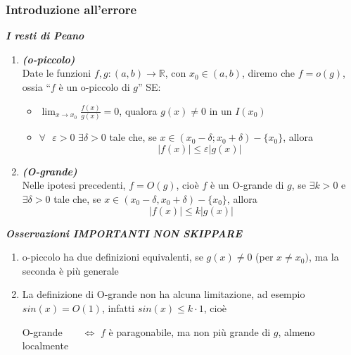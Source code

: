 \documentclass{article}
\theoremstyle{definition}
\newcommand{\R}{\mathbb{R}}
\newcommand{\virgolette}[1]{``#1''}
\begin{document}
\subsubsection{Introduzione all'errore}
    \begin{center}
        \textbf{\textit{I resti di Peano}}
    \end{center}
    \begin{enumerate}
        \item \textbf{\textit{(o-piccolo)}}
        \\
        Date le funzioni $f,g: (a,b) \to \R$, con $x_0 \in (a,b)$, diremo che $f=o(g)$, ossia \virgolette{$f$ è un o-piccolo di $g$} SE:
        \begin{itemize}
            \item $\lim_{x \to x_0}\frac{f(x)}{g(x)}=0$, qualora $g(x) \neq 0$ in un $I(x_0)$
            \item $\forall \,\,\,\, \varepsilon>0$ $\exists \delta > 0$ tale che, se $x \in (x_0-\delta; x_0+\delta)-\{x_0\}$, allora
            \begin{equation}
                |f(x)| \leqslant \varepsilon|g(x)|
            \end{equation}
        \end{itemize}
        \item \textbf{\textit{(O-grande)}} \\
        Nelle ipotesi precedenti, $f=O(g)$, cioè $f$ è un O-grande di $g$, se $\exists k>0$ e $\exists \delta > 0$ tale che, se $x \in (x_0-\delta, x_0+\delta)-\{x_0\}$, allora 
        \begin{equation}
            |f(x)| \leqslant k|g(x)|
        \end{equation}
    \end{enumerate}
\begin{center}
    \textbf{\textit{Osservazioni IMPORTANTI NON SKIPPARE}}
\end{center}
\begin{enumerate}
    \item o-piccolo ha due definizioni equivalenti, se $g(x) \neq 0$ (per $x \neq x_0)$, ma la seconda è più generale
    \item La definizione di O-grande non ha alcuna limitazione, ad esempio $sin(x)=O(1)$, infatti $sin(x) \leqslant k \cdot 1$, cioè
    \begin{center}
        O-grande \,\,\,\,\,\,\,\, $\Longleftrightarrow$ $f$ è paragonabile, ma non più grande di $g$, almeno localmente
    \end{center}
    \begin{center}
    \end{center}
\end{enumerate}
\end{document}
